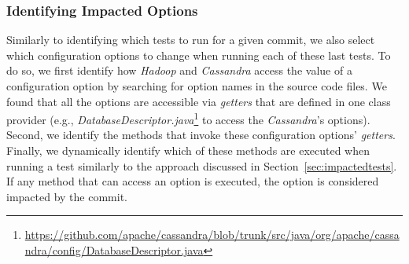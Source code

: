 

\subsubsection{Identifying Impacted Options}%
Similarly to identifying which tests to run for a given commit, we also select which configuration options to change when running each of these last tests. To do so, we first identify how \emph{Hadoop} and \emph{Cassandra} access the value of a configuration option by searching for option names in the source code files. We found that all the options are accessible via \emph{getters} that are defined in one class provider (e.g., \emph{DatabaseDescriptor.java}\footnote{\url{https://github.com/apache/cassandra/blob/trunk/src/java/org/apache/cassandra/config/DatabaseDescriptor.java}} to access the \emph{Cassandra}'s options). Second, we identify the methods that invoke these configuration options' \emph{getters}. Finally, we dynamically identify which of these methods are executed when running a test similarly to the approach discussed in Section~\ref{sec:impactedtests}. If any method that can access an option is executed, the option is considered impacted by the commit.

